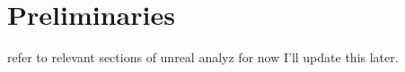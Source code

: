 \documentclass[../Main.tex]{subfiles}
\begin{document}
\section{Preliminaries}

refer to relevant sections of unreal analyz for now I'll update this later.





\end{document}
